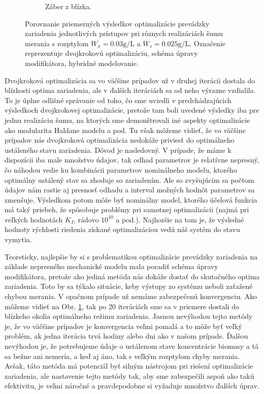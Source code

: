 \begin{figure}
\begin{subfigure}[b]{0.49\textwidth}
		\caption{Záber z blízka. \newline \newline}
		\label{fig:opt_approaches_comparison_zoomed}
	\end{subfigure}
	\caption{Porovnanie priemerných výsledkov optimalizácie prevádzky zariadenia jednotlivých prístupov pri rôznych realizáciách šumu merania s rozptylom $ W_{x} = 0.03\si{\gram\per\liter} $ a $ W_{s} = 0.025\si{\gram\per\liter} $. Označenie  reprezentuje dvojkrokovú optimalizáciu,  schéma úpravy modifikátora,  hybridné modelovanie.}
	\label{fig:method_comparison_bigNoise}
\end{figure}

Dvojkroková optimalizácia sa vo väčšine prípadov už v druhej iterácii dostala do blízkosti optima zariadenia, ale v ďalších iteráciách sa od neho výrazne vzdialila. To je úplne odlišné správanie od toho, čo sme uviedli v predchádzajúcich výsledkoch dvojkrokovej optimalizácie, pretože tam boli uvedené výsledky iba pre jednu realizáciu šumu, na ktorých sme demonštrovali iné aspekty optimalizácie ako modularita Haldane modelu a pod. Tu však môžeme vidieť, že vo väčšine prípadov nás dvojkroková optimalizácia nedokáže priviesť do optimálneho ustáleného stavu zariadenia. Dôvod je nasledovný. V prípade, že máme k dispozícii iba male množstvo údajov, tak odhad parametrov je relatívne nepresný, čo náhodou vedie ku kombinácii parametrov nominálneho modelu, ktorého optimálny ustálený stav sa zhoduje so zariadením. Ale so zvyšujúcim sa počtom údajov nám rastie aj presnosť odhadu a interval možných hodnôt parametrov sa zmenšuje. Výsledkom potom môže byť nominálny model, ktorého účelová funkcia má taký priebeh, že spôsobuje problémy pri samotnej optimalizácii (najmä pri veľkých hodnotách $ K_I $, rádovo $ 10^{10} $ a pod.). Najhoršie na tom je, že výsledné hodnoty rýchlosti riedenia získané optimalizáciou vedú náš systém do stavu vymytia.

Teoreticky, najlepšie by si s problematikou optimalizácie prevádzky zariadenia na základe nepresného mechanické modelu mala poradiť schéma úpravy modifikátora, pretože ako jediná metóda nás dokáže dostať do skutočného optima zariadenia. Toto by sa týkalo situácie, keby výstupy zo systému neboli zaťažené chybou merania. V opačnom prípade už nemáme zabezpečenú konvergenciu. Ako môžeme vidieť na Obr. \ref{fig:opt_approaches_comparison_zoomed}, tak po 20 iteráciách sme sa v priemere dostali do blízkeho okolia optimálneho režimu zariadenia. Jasnou nevýhodou tejto metódy je, že vo väčšine prípadov je konvergencia veľmi pomalá a to môže byť veľký problém, ak jedna iterácia trvá hodiny alebo dni ako v našom prípade. Ďalšou nevýhodou je, že potrebujeme údaje o ustálenom stave koncentrácie biomasy a tá sa bežne ani nemeria, a keď aj áno, tak s veľkým rozptylom chyby merania. Avšak, táto metóda má potenciál byť silným nástrojom pri riešení optimalizácie zariadenia, ale nastavenie tejto metódy tak, aby sme zabezpečili aspoň ako takú efektivitu, je veľmi náročné a pravdepodobne si vyžaduje množstvo ďalších úprav.

